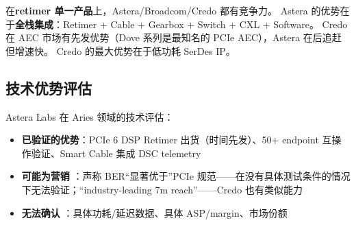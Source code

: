 在\textbf{retimer 单一产品}上，Astera/Broadcom/Credo 都有竞争力。
Astera 的优势在于\textbf{全栈集成}：Retimer + Cable + Gearbox + Switch + CXL + Software。
Credo 在 AEC 市场有先发优势（Dove 系列是最知名的 PCIe AEC），Astera 在后追赶但增速快。
Credo 的最大优势在于低功耗 SerDes IP。

\subsection{技术优势评估}

Astera Labs 在 Aries 领域的技术评估：
\begin{itemize}
    \item \textbf{已验证的优势}：PCIe 6 DSP Retimer 出货（时间先发）、50+ endpoint 互操作验证、Smart Cable 集成 DSC telemetry
    \item \textbf{可能为营销} \marketing{}：声称 BER``显著优于''PCIe 规范——在没有具体测试条件的情况下无法验证；``industry-leading 7m reach''——Credo 也有类似能力
    \item \textbf{无法确认} \unverified{}：具体功耗/延迟数据、具体 ASP/margin、市场份额
\end{itemize}
